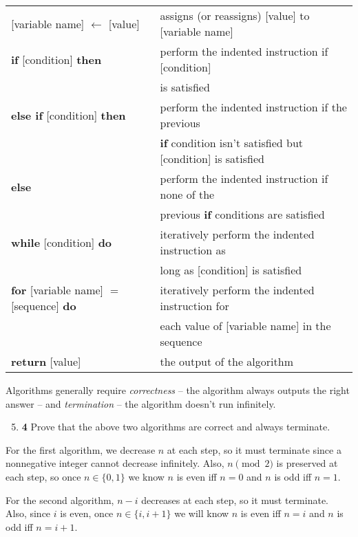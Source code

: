 \documentclass[12pt]{article}
\theoremstyle{plain}
\theoremstyle{definition}
\theoremstyle{remark}
\newcommand{\pts}[1]{\lbrack\textbf{#1}\rbrack}
\begin{document}
\begin{center}
\begin{tabular}{l|l}
[variable name] $\gets$ [value] & assigns (or reassigns) [value] to [variable name] \\
\textbf{if} [condition] \textbf{then} & perform the indented instruction if [condition] \\
& is satisfied \\
\textbf{else if} [condition] \textbf{then} & perform the indented instruction if the previous \\ 
& \textbf{if} condition isn't satisfied but [condition] is satisfied \\
\textbf{else} & perform the indented instruction if none of the \\
& previous \textbf{if} conditions are satisfied \\
\textbf{while} [condition] \textbf{do} & iteratively perform the indented instruction as \\ & long as [condition] is satisfied \\
\textbf{for} [variable name] $=$ [sequence] \textbf{do} & iteratively perform the indented instruction for \\
& each value of [variable name] in the sequence \\
\textbf{return} [value] & the output of the algorithm
\end{tabular}
\end{center}

Algorithms generally require \emph{correctness} -- the algorithm always outputs the right answer -- and \emph{termination} -- the algorithm doesn't run infinitely.

\begin{enumerate}
\setcounter{enumi}{4}

\item \pts{4} Prove that the above two algorithms are correct and always terminate.
\end{enumerate}

\begin{tcolorbox}
For the first algorithm, we decrease $n$ at each step, so it must terminate since a nonnegative integer cannot decrease infinitely. Also, $n\pmod2$ is preserved at each step, so once $n\in\{0,1\}$ we know $n$ is even iff $n=0$ and $n$ is odd iff $n=1$.

For the second algorithm, $n-i$ decreases at each step, so it must terminate. Also, since $i$ is even, once $n\in\{i,i+1\}$ we will know $n$ is even iff $n=i$ and $n$ is odd iff $n=i+1$.
\end{tcolorbox}
\end{document}
